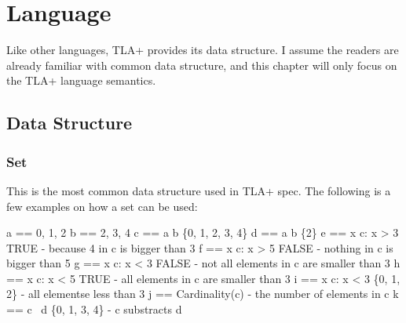 
% 

\chapter{Language}

Like other languages, TLA+ provides its data structure. I assume the readers are
already familiar with common data structure, and this chapter will only focus on
the TLA+ language semantics. 

\section{Data Structure}

\subsection{Set}

This is the most common data structure used in TLA+ spec. The following is a few examples on
how a set can be used:\newline
\begin{tla}
a == {0, 1, 2}
b == {2, 3, 4}
c == a \union b         \* \{0, 1, 2, 3, 4\}
d == a \intersect b     \* \{2\}
e == \E x \in c: x > 3  \* TRUE - because 4 in c is bigger than 3
f == \E x \in c: x > 5  \* FALSE - nothing in c is bigger than 5
g == \A x \in c: x < 3  \* FALSE - not all elements in c are smaller than 3
h == \A x \in c: x < 5  \* TRUE - all elements in c are smaller than 3
i == {x \in c: x < 3}   \* \{0, 1, 2\} - all elementse less than 3
j == Cardinality(c)      - the number of elements in c
k == c \ d              \* \{0, 1, 3, 4\} - c substracts d
\end{tla}
\begin{tlatex}
%
%
%
%
\@xx{}%
%
%
\@xx{}%
%
%
\@xx{}%
%
%
\@xx{}%
%
%
\@xx{}%
%
%
\@xx{}%
%
%
\@xx{}%
%
%
\@xx{}%
%
%
\@xx{}%
\end{tlatex}

